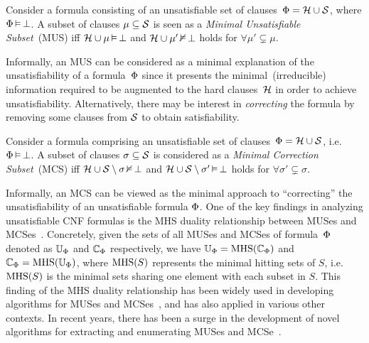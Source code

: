 \begin{definition} \label{def:mus}
  Consider a formula consisting of an unsatisfiable set of clauses~$\Phi={\mathcal{H}}\cup{\mathcal{S}}$,
  where $\Phi\operatorname*{\vDash}\bot$.
  A subset of clauses $\mu\subseteq{\mathcal{S}}$ is seen as a \emph{Minimal Unsatisfiable Subset}~(MUS) 
  iff ${\mathcal{H}}\cup\mu\operatorname*{\vDash}\bot$ and ${\mathcal{H}}\cup\mu'\operatorname*{\nvDash}\bot$ holds for $\forall{\mu'\subsetneq\mu}$.
\end{definition}
%
Informally, an MUS can be considered as a minimal explanation of the unsatisfiability of a formula~$\Phi$
since it presents the minimal~(irreducible) information required to be augmented to the 
hard clauses~${\mathcal{H}}$ in order to achieve unsatisfiability.
%
Alternatively, there may be interest in \emph{correcting} the formula by 
removing some clauses from ${\mathcal{S}}$ to obtain satisfiability.
%
\begin{definition} \label{def:mcs}
  Consider a formula comprising an unsatisfiable set of clauses~$\Phi={\mathcal{H}}\cup{\mathcal{S}}$, 
  i.e. $\Phi\operatorname*{\vDash}\bot$.
  A subset of clauses $\sigma\subseteq{\mathcal{S}}$ is considered as a 
  \emph{Minimal Correction Subset}~(MCS) iff
  ${\mathcal{H}}\cup{\mathcal{S}}\setminus\sigma\operatorname*{\nvDash}\bot$ and 
  ${\mathcal{H}}\cup{\mathcal{S}}\setminus\sigma'\operatorname*{\vDash}\bot$ holds for
  $\forall{\sigma'\subsetneq\sigma}$.
\end{definition}
%
Informally, an MCS can be viewed as the minimal approach to ``correcting'' 
the unsatisfiability of an unsatisfiable formula $\Phi$.
%
One of the key findings in analyzing unsatisfiable CNF formulas is
the MHS
duality relationship between MUSes 
and MCSes~\cite{reiter-aij87,lozinskii-jetai03}.
%
Concretely, given the sets of all MUSes and MCSes of formula~$\Phi$
denoted as $\mathbb{U}_\Phi$ and $\mathbb{C}_\Phi$ respectively,  
we have $\mathbb{U}_\Phi = \textrm{MHS}(\mathbb{C}_\Phi)$ and $\mathbb{C}_\Phi = \textrm{MHS}(\mathbb{U}_\Phi)$,
where $\textrm{MHS}(S)$ represents the minimal hitting sets of $S$, i.e.
$\textrm{MHS}(S)$ is the minimal sets sharing one element with each subset in $S$.
%
%
This finding of the MHS duality relationship has been widely used 
in developing algorithms for MUSes and MCSes~\cite{stuckey-padl05,liffiton-jar08,lpmms-cj16}, 
and has also applied in various other contexts.
%
In recent years, there has been a surge in the development of novel algorithms 
for extracting and enumerating MUSes and
MCSe~\cite{mpms-ijcai15,bacchus-cav15,lpmms-cj16,mipms-sat16,pmjms-aaai18,lagniez-ijcai18,narodytska-ijcai18,bendik-atva18}.
